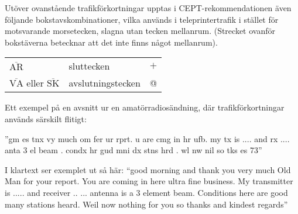 Utöver ovanstående trafikförkortningar upptas i CEPT-rekommendationen
även följande bokstavskombinationer, vilka används i teleprintertrafik
i stället för motsvarande morsetecken, slagna utan tecken mellanrum.
(Strecket ovanför bokstäverna betecknar att det inte finns något
mellanrum).

\begin{tabular}{lll}
  \(\overline{\mathrm{AR}}\) & sluttecken & \(+\) \\
  \(\overline{\mathrm{VA}}\) eller \(\overline{\mathrm{SK}}\) & avslutningstecken & @ \\
\end{tabular}

Ett exempel på en avsnitt ur en amatörradiosändning, där
trafikförkortningar används särskilt flitigt:

''gm es tnx vy much om fer ur rprt. u are cmg in hr ufb. my tx is
.... and rx .... anta 3 el beam . condx hr gud mni dx stns hrd . wl nw
nil so tks es 73''

I klartext ser exemplet ut så här: ``good morning and thank you very
much Old Man for your report. You are coming in here ultra fine
business. My transmitter is .....  and receiver .. ... antenna is a 3
element beam. Conditions here are good many stations heard. Weil now
nothing for you so thanks and kindest regards''